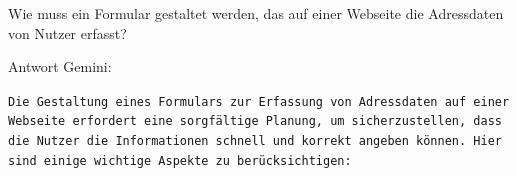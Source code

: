 \begin{tcolorbox}[
	enhanced,
	breakable,
	colback=BhtColorYellow!5!white,
	colframe=BhtColorYellow!75!black,
	title= Nutzer Prompt
	]
Wie muss ein Formular gestaltet werden, das auf einer Webseite die Adressdaten von Nutzer erfasst?
\end{tcolorbox}

Antwort Gemini:
\begin{tcolorbox}[
	enhanced,
	breakable,
	colback=BhtGrey!5!white,
	colframe=BhtGrey!75!black!50,
	title= LLM Antwort Gemini
	]
\texttt{Die Gestaltung eines Formulars zur Erfassung von Adressdaten auf einer Webseite erfordert eine sorgfältige Planung, um sicherzustellen, dass die Nutzer die In\-for\-ma\-tio\-nen schnell und korrekt angeben können. Hier sind einige wichtige As\-pek\-te zu berücksichtigen:}\vspace{0.2cm}


\end{tcolorbox}
